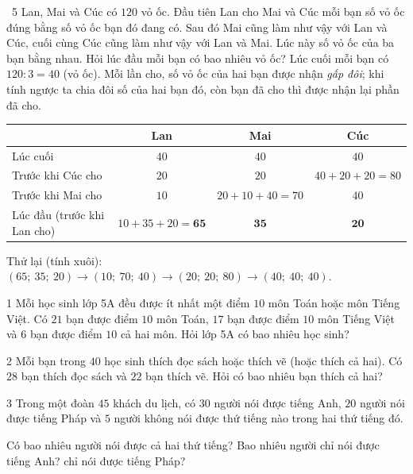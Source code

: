 \gap
\begin{exbox}{\ExWord\ 5}
Lan, Mai và Cúc có $120$ vỏ ốc. Đầu tiên Lan cho Mai và Cúc mỗi bạn số vỏ ốc đúng bằng số vỏ ốc bạn đó đang có. Sau đó Mai cũng làm như vậy với Lan và Cúc, cuối cùng Cúc cũng làm như vậy với Lan và Mai. Lúc này số vỏ ốc của ba bạn bằng nhau. Hỏi lúc đầu mỗi bạn có bao nhiêu vỏ ốc?
\guide
Lúc cuối mỗi bạn có $120:3=40$ (vỏ ốc). Mỗi lần cho, số vỏ ốc của hai bạn được nhận \emph{gấp đôi}; khi tính ngược ta chia đôi số của hai bạn đó, còn bạn đã cho thì được nhận lại phần đã cho.
\begin{center}
\renewcommand{\arraystretch}{1.25}
\begin{tabular}{|l|c|c|c|}
\hline
 & Lan & Mai & Cúc\\\hline
Lúc cuối & $40$ & $40$ & $40$\\\hline
Trước khi Cúc cho & $20$ & $20$ & $40+20+20=80$\\\hline
Trước khi Mai cho & $10$ & $20+10+40=70$ & $40$\\\hline
Lúc đầu (trước khi Lan cho) & $10+35+20=\mathbf{65}$ & $\mathbf{35}$ & $\mathbf{20}$\\\hline
\end{tabular}
\end{center}
Thử lại (tính xuôi): $(65;\ 35;\ 20)\to(10;\ 70;\ 40)\to(20;\ 20;\ 80)\to(40;\ 40;\ 40)$.
\end{exbox}
\begin{probbox}{1}{\relax}
Mỗi học sinh lớp 5A đều được ít nhất một điểm $10$ môn Toán hoặc môn Tiếng Việt. Có $21$ bạn được điểm $10$ môn Toán, $17$ bạn được điểm $10$ môn Tiếng Việt và $6$ bạn được điểm $10$ cả hai môn. Hỏi lớp 5A có bao nhiêu học sinh?
\end{probbox}
\gap
\begin{probbox}{2}{\relax}
Mỗi bạn trong $40$ học sinh thích đọc sách hoặc thích vẽ (hoặc thích cả hai). Có $28$ bạn thích đọc sách và $22$ bạn thích vẽ. Hỏi có bao nhiêu bạn thích cả hai?
\end{probbox}
\gap
\begin{probbox}{3}{\relax}
Trong một đoàn $45$ khách du lịch, có $30$ người nói được tiếng Anh, $20$ người nói được tiếng Pháp và $5$ người không nói được thứ tiếng nào trong hai thứ tiếng đó.\par
{} Có bao nhiêu người nói được cả hai thứ tiếng? \quad {} Bao nhiêu người chỉ nói được tiếng Anh? \quad {} chỉ nói được tiếng Pháp?
\end{probbox}
